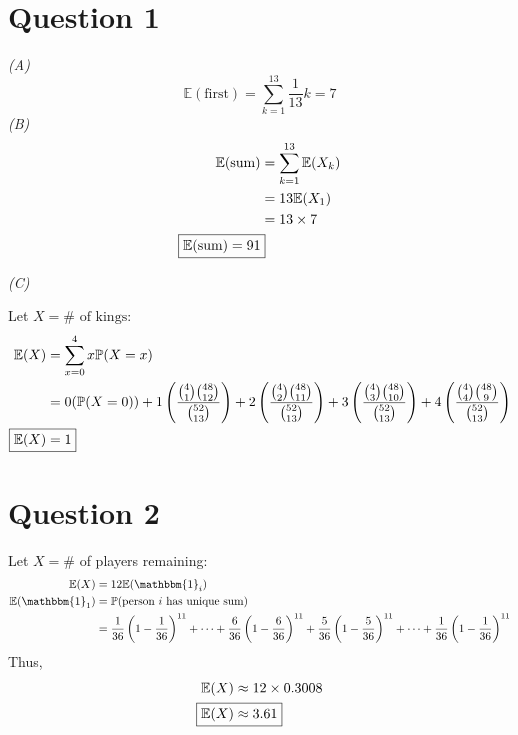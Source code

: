\documentclass[titlepage, 12pt, leqno]{article}
\begin{document}
\setlength{\parskip}{1\baselineskip}
\setlength{\parindent}{15pt}
\newpage


\section{Question 1}

\textit{(A)}
\[
\boxed{ \mathbb{E}( \text{first}) = \sum_{k=1}^{13}\frac{1}{13}k = 7} 
\]
\textit{(B)}
\begin{align*}
    \mathbb{E}( \text{sum}) &= \sum_{k=1}^{13} \mathbb{E}(X_k) \\
                            &= 13 \mathbb{E}(X_1) \\
                            &= 13 \times 7 \\
                        \Aboxed{\mathbb{E}( \text{sum}) = 91}
\end{align*}

\textit{(C)}

Let $X = \# \text{ of kings}$:
\begin{align*}
    \mathbb{E}(X) &= \sum_{x=0}^{4}x \mathbb{P}(X=x) \\
                  &= 0(\mathbb{P}(X=0)) + 1\left(\frac{\binom{4}{1}
                      \binom{48}{12}}{\binom{52}{13}}\right) +
                        2\left(\frac{\binom{4}{2}
                      \binom{48}{11}}{\binom{52}{13}}\right) +
                        3\left(\frac{\binom{4}{3}
                      \binom{48}{10}}{\binom{52}{13}}\right) +
                        4\left(\frac{\binom{4}{4}
                      \binom{48}{9}}{\binom{52}{13}}\right) \\
    \Aboxed{ \mathbb{E}(X) &= 1} 
\end{align*}

\pagebreak
\section{Question 2}
Let $X = \# $ of players remaining:
\begin{align*}
    \mathbb{E}(X) &= 12 \mathbb{E}( \mathbbm{1}_{i}) \\
    \mathbb{E}( \mathbbm{1}_{1}) &=\mathbb{P}(\text{person }i 
    \text{ has unique sum}) \\
                                 &= \frac{1}{36}\left(1-
                                     \frac{1}{36}\right)^{11}+\cdots+
                      \frac{6}{36}\left(1-\frac{6}{36}\right)^{11} + 
                      \frac{5}{36}\left(1-\frac{5}{36}\right)^{11} + \cdots +
                  \frac{1}{36}\left(1-\frac{1}{36}\right)^{11}\\
\end{align*}
Thus, 
\begin{align*}
    \mathbb{E}(X) &\approx 12\times 0.3008 \\
    \Aboxed{ \mathbb{E}(X) &\approx 3.61} 
\end{align*}
\end{document}
